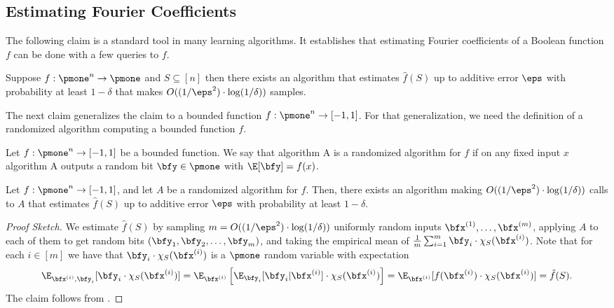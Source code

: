 \subsection{Estimating Fourier Coefficients}
The following claim is a standard tool in many learning algorithms. It establishes that estimating Fourier coefficients of a Boolean function $f$ can be done with a few queries to $f$.
\begin{claim}
Suppose $f: \pmone^n \to \pmone$ and $S \subseteq [n]$ then there exists an algorithm that estimates $\hat{f}(S)$ up to additive error $\eps$ with probability at least $1-\delta$ that makes $O((1/\eps^2) \cdot \log(1/\delta))$ samples.
\end{claim}
%
%
%
%
%

The next claim generalizes the claim to a bounded function $f: \pmone^n \to [-1,1]$.
For that generalization, we need the definition of a randomized algorithm computing a bounded function $f$.
\begin{definition}\label{def:randomized algorithm for bounded function}
Let $f: \pmone^n \to [-1,1]$ be a bounded function. We say that
algorithm A is a randomized algorithm for $f$ if on any fixed input $x$ algorithm A outputs a random bit $\bfy\in \pmone$ with $\E[\bfy] = f(x)$.
\end{definition}


\begin{claim}\label{claim:estimate Fourier non-Boolean}
Let $f: \pmone^n \to [-1,1]$, and 
let $A$ be a randomized algorithm for $f$.
Then, there exists an algorithm making $O((1/\eps^2) \cdot \log(1/\delta))$ calls to $A$ that estimates $\hat{f}(S)$ up to additive error $\eps$ with probability at least $1-\delta$.
\end{claim}
%
\begin{proof}[Proof Sketch]
We estimate $\hat{f}(S)$ by sampling $m = O((1/\eps^2) \cdot \log(1/\delta))$ uniformly random inputs $\bfx^{(1)}, \ldots, \bfx^{(m)}$, applying $A$ to  each of them to get random bits $(\bfy_1, \bfy_2, \ldots, \bfy_m)$, and taking the empirical mean of $\frac{1}{m} \sum_{i=1}^{m} \bfy_i \cdot \chi_S(\bfx^{(i)})$.
	Note that for each $i \in [m]$ we have that  $\bfy_i \cdot \chi_S(\bfx^{(i)})$ is a $\pmone$ random variable with expectation 
	$$\E_{\bfx^{(i)}, \bfy_i}[\bfy_i \cdot \chi_S(\bfx^{(i)})] = \E_{\bfx^{(i)}}\left[\E_{\bfy_i}[\bfy_i|\bfx^{(i)}]\cdot \chi_S(\bfx^{(i)})\right] = 
	\E_{\bfx^{(i)}}[f(\bfx^{(i)}) \cdot \chi_S(\bfx^{(i)})] = \hat{f}(S).$$
	The claim follows from .
\end{proof}

